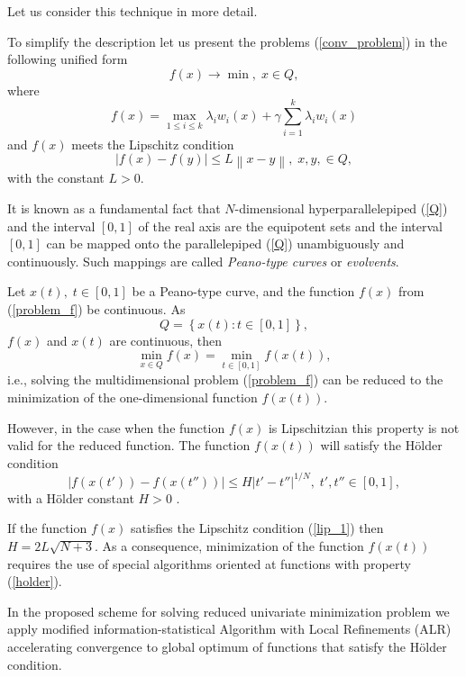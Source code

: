 \documentclass[runningheads]{llncs}
\begin{document}
Let us consider this technique in more detail.

To simplify the description let us present the problems (\ref{conv_problem}) in the following unified form
\begin{equation}\label{problem_f}
f(x) \rightarrow \min, \; x \in Q,
\end{equation}
where 
\[
f(x) = \max_{1 \leq i \leq k}{\lambda_i w_i(x)} + \gamma \sum_{i=1}^k{\lambda_i w_i(x)}
\]
and $f(x)$ meets the Lipschitz condition 
\begin{equation}\label{lip_1}
\left| f(x) - f(y)\right| \leq L \left\| x-y \right\|, \; x,y, \in Q,
\end{equation}
with the constant $L>0$.

It is known as a fundamental fact that $N$-dimensional hyperparallelepiped (\ref{Q}) and the interval $[0,1]$ of the real axis are the equipotent sets and the interval $[0,1]$ can be mapped onto the parallelepiped (\ref{Q}) unambiguously and continuously. Such mappings are called \textit{Peano-type curves} or \textit{evolvents}.


Let $x(t), \; t \in [0,1]$  be a Peano-type curve, and the function  $f(x)$ from (\ref{problem_f}) be continuous. As
\[
Q =\left\{x(t) : t \in [0,1]\right\},
\]
$f(x)$ and $x(t)$ are continuous, then
\[
\min_{x \in Q} f(x) = \min_{t \in [0,1]}f(x(t)),
\]
i.e., solving the multidimensional problem (\ref{problem_f}) can be reduced to the minimization of the one-dimensional function $f(x(t))$.

However, in the case when the function $f(x)$ is Lipschitzian this property is not valid for the reduced function. The function $f(x(t))$ will satisfy the H{\"o}lder condition
\begin{equation}\label{holder}
\left|f(x(t'))-f(x(t''))\right| \leq H \left|t'-t''\right|^{1/N}, \; t',t'' \in [0,1],
\end{equation}
with a H{\"o}lder constant $H>0$ \cite{Strongin2000,Sergeyev2013}.

If the function $f(x)$ satisfies the Lipschitz condition (\ref{lip_1}) then $H=2L\sqrt{N+3}$.
As a consequence, minimization of the function $f(x(t))$  requires the use of special algorithms oriented at functions with property (\ref{holder}).

In the proposed scheme for solving reduced univariate minimization problem we apply modified information-statistical Algorithm \cite{Strongin2000} with Local Refinements (ALR) accelerating convergence to global optimum of functions that satisfy the H{\"o}lder condition.
\end{document}
